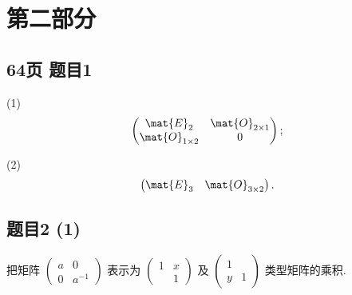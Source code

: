 \newpage
\section{第二部分}
\subsection*{64页 题目1}
(1)
\[
\begin{pmatrix}
    \mat{E}_2 & \mat{O}_{2 \times 1} \\
    \mat{O}_{1 \times 2} & 0
\end{pmatrix};
\]

(2)
\[
\begin{pmatrix}
    \mat{E}_3 & \mat{O}_{3 \times 2}
\end{pmatrix}.
\]

\subsection*{题目2 (1)}
\begin{problem}
把矩阵 $\begin{pmatrix}a & 0 \\ 0 & a^{-1} \end{pmatrix}$ 表示为 $\begin{pmatrix}1 & x \\  & 1 \end{pmatrix}$ 及 $\begin{pmatrix}1 &  \\ y & 1 \end{pmatrix}$ 类型矩阵的乘积.
\end{problem}
